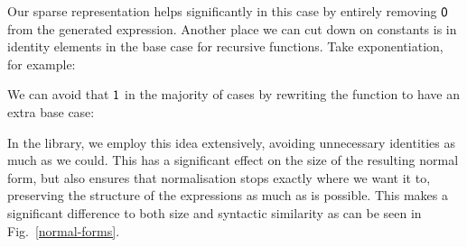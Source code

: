 \documentclass[acmsmall,review,anonymous]{acmart}\settopmatter{printfolios=true,printccs=false,printacmref=false}
\theoremstyle{remark}
\begin{document}
Our sparse representation helps significantly in this case by entirely removing
\(\AgdaNumber{0}\) from the generated expression. Another place we can cut down
on constants is in identity elements in the base case for recursive functions.
Take exponentiation, for example:
\begin{center}
\end{center}
We can avoid that \(\AgdaNumber{1}\) in the majority of cases by rewriting the
function to have an extra base case:
\begin{multicols}{2}
  \centering
\end{multicols}
In the library, we employ this idea extensively, avoiding unnecessary identities
as much as we could. This has a significant effect on the size of the resulting
normal form, but also ensures that normalisation stops exactly where we want it
to, preserving the structure of the expressions as much as is possible. This
makes a significant difference to both size and syntactic
similarity as can be seen in Fig.~\ref{normal-forms}.
\end{document}
